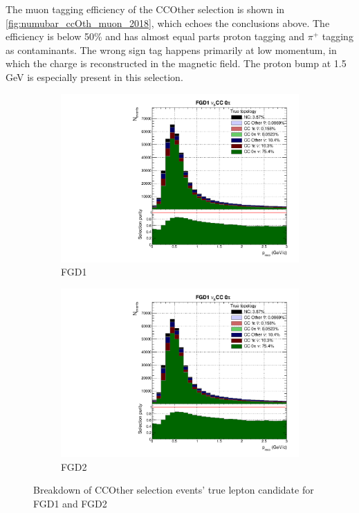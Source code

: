 The muon tagging efficiency of the \numubar CCOther selection is shown in \autoref{fig:numubar_ccOth_muon_2018}, which echoes the conclusions above. The efficiency is below 50\% and has almost equal parts proton tagging and $\pi^+$ tagging as contaminants. The wrong sign tag happens primarily at low momentum, in which the charge is reconstructed in the magnetic field. The proton bump at 1.5 GeV is especially present in this selection.
\begin{figure}[h]
	\begin{subfigure}[t]{0.49\textwidth}
		\includegraphics[width=\textwidth,page=18, trim={0mm 0mm 0mm 9mm}, clip]{figures/mach3/2018/Selection/2018_RedNDmatrix_rebin_verbose_may_noweights_diagnostics}
		\caption{FGD1}
	\end{subfigure}
	\begin{subfigure}[t]{0.49\textwidth}
		\includegraphics[width=\textwidth,page=24, trim={0mm 0mm 0mm 9mm}, clip]{figures/mach3/2018/Selection/2018_RedNDmatrix_rebin_verbose_may_noweights_diagnostics}
		\caption{FGD2}
	\end{subfigure}
	\caption{Breakdown of \numubar CCOther selection events' true lepton candidate for FGD1 and FGD2}
	\label{fig:numubar_ccOth_muon_2018}
\end{figure}

